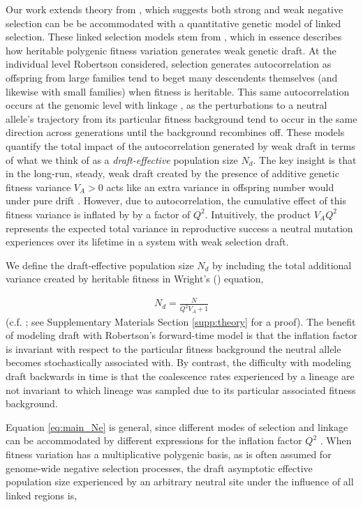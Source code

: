 \documentclass[11pt]{article}
\begin{document}
Our work extends theory from \textcite{Santiago2016-mu}, which suggests both
strong and weak negative selection can be be accommodated with a quantitative
genetic model of linked selection. These linked selection models stem from
\textcite{Robertson1961-ho}, which in essence describes how heritable polygenic
fitness variation generates weak genetic draft. At the individual level
Robertson considered, selection generates autocorrelation as offspring from
large families tend to beget many descendents themselves (and likewise with
small families) when fitness is heritable. This same autocorrelation occurs at
the genomic level with linkage \parencite{Santiago1998-bs,Barton2000-zg}, as
the perturbations to a neutral allele's trajectory from its particular fitness
background tend to occur in the same direction across generations until the
background recombines off. These models quantify the total impact of the
autocorrelation generated by weak draft in terms of what we think of as a
\emph{draft-effective} population size $N_d$. The key insight is that in the
long-run, steady, weak draft created by the presence of additive genetic
fitness variance $V_A > 0$ acts like an extra variance in offspring number
would under pure drift \parencite{Wright1938-tv}. However, due to
autocorrelation, the cumulative effect of this fitness variance is inflated by
by a factor of $Q^2$. Intuitively, the product $V_A Q^2$ represents the
expected total variance in reproductive success a neutral mutation experiences
over its lifetime in a system with weak selection draft. 

We define the draft-effective population size $N_d$ by including the total
additional variance created by heritable fitness in Wright's
(\citeyear{Wright1938-tv}) equation,

\begin{align}
    \label{eq:main_Ne}
    N_d = \frac{N}{Q^2 V_A + 1}
\end{align}
%
(c.f. \cite{Robertson1961-ho,Santiago1995-hx}; see Supplementary Materials Section
\ref{supp:theory} for a proof). The benefit of modeling draft with Robertson's
forward-time model is that the inflation factor is invariant with respect to
the particular fitness background the neutral allele becomes stochastically
associated with. By contrast, the difficulty with modeling draft backwards in
time is that the coalescence rates experienced by a lineage are not invariant
to which lineage was sampled due to its particular associated fitness
background.

Equation \eqref{eq:main_Ne} is general, since different modes of selection and
linkage can be accommodated by different expressions for the inflation factor
$Q^2$ \parencite{Santiago1995-hx,Santiago1998-bs}. When fitness variation has a
multiplicative polygenic basis, as is often assumed for genome-wide negative
selection processes, the draft asymptotic effective population size experienced
by an arbitrary neutral site under the influence of all linked regions is,
\end{document}

